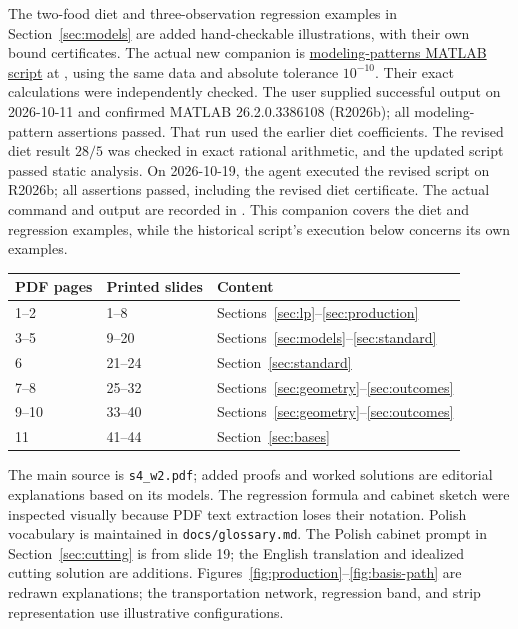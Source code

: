 \documentclass[11pt,a4paper]{article}
\begin{document}
The two-food diet and three-observation regression examples in
Section~\ref{sec:models} are added hand-checkable illustrations, with their
own bound certificates. The actual new companion is
\href{run:matlab/exercises/modeling_patterns_checks.m}{modeling-patterns MATLAB script} at ,
using the same data and absolute tolerance $10^{-10}$. Their exact calculations
were independently checked. The user supplied successful output on 2026-10-11
and confirmed MATLAB 26.2.0.3386108 (R2026b); all modeling-pattern assertions passed.
That run used the earlier diet coefficients. The revised diet result $28/5$
was checked in exact rational arithmetic, and the updated script passed static
analysis. On 2026-10-19, the agent executed the revised script on R2026b;
all assertions passed, including the revised diet certificate. The actual
command and output are recorded in
.
This companion covers the diet and regression examples, while the historical
script's execution below concerns its own examples.

\begin{center}
  \begin{tabular}{lll}\toprule
    PDF pages & Printed slides & Content\\\midrule
    1--2 & 1--8 & Sections~\ref{sec:lp}--\ref{sec:production}\\
    3--5 & 9--20 & Sections~\ref{sec:models}--\ref{sec:standard}\\
    6 & 21--24 & Section~\ref{sec:standard}\\
    7--8 & 25--32 & Sections~\ref{sec:geometry}--\ref{sec:outcomes}\\
    9--10 & 33--40 & Sections~\ref{sec:geometry}--\ref{sec:outcomes}\\
    11 & 41--44 & Section~\ref{sec:bases}\\\bottomrule
  \end{tabular}
\end{center}
The main source is \texttt{s4\_w2.pdf}; added proofs and worked solutions are
editorial explanations based on its models. The regression formula and cabinet
sketch were inspected visually because PDF text extraction loses their notation.
Polish vocabulary is maintained in \texttt{docs/glossary.md}.
The Polish cabinet prompt in Section~\ref{sec:cutting} is from slide 19;
the English translation and idealized cutting solution are additions.
Figures~\ref{fig:production}--\ref{fig:basis-path} are redrawn explanations;
the transportation network, regression band, and strip representation use
illustrative configurations.
\end{document}
